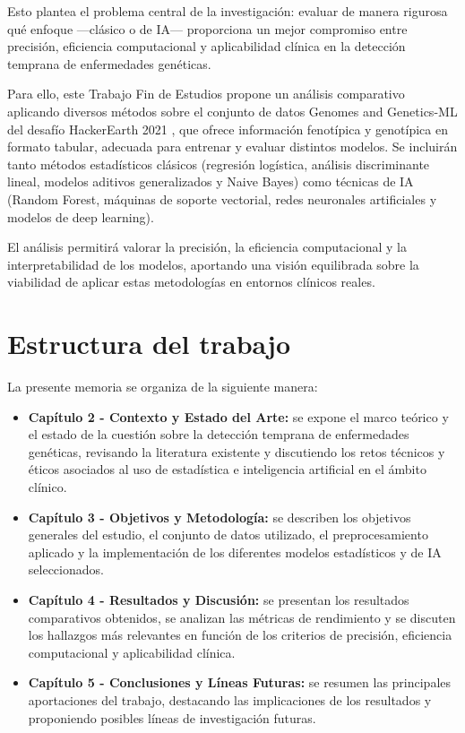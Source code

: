 \documentclass[11pt,a4paper,spanish]{book}
\numberwithin{equation}{chapter}
\numberwithin{figure}{chapter}
\begin{document}
Esto plantea el problema central de la investigación: evaluar de manera rigurosa qué enfoque —clásico o de IA— proporciona un mejor compromiso entre precisión, eficiencia computacional y aplicabilidad clínica en la detección temprana de enfermedades genéticas. 

Para ello, este Trabajo Fin de Estudios propone un análisis comparativo aplicando diversos métodos sobre el conjunto de datos Genomes and Genetics-ML del desafío HackerEarth 2021 \cite{kagglePredictGenetic}, que ofrece información fenotípica y genotípica en formato tabular, adecuada para entrenar y evaluar distintos modelos. Se incluirán tanto métodos estadísticos clásicos (regresión logística, análisis discriminante lineal, modelos aditivos generalizados y Naive Bayes) como técnicas de IA (Random Forest, máquinas de soporte vectorial, redes neuronales artificiales y modelos de deep learning). 

El análisis permitirá valorar la precisión, la eficiencia computacional y la interpretabilidad de los modelos, aportando una visión equilibrada sobre la viabilidad de aplicar estas metodologías en entornos clínicos reales.

\section{Estructura del trabajo}
La presente memoria se organiza de la siguiente manera:

\begin{itemize}
    \item \textbf{Capítulo 2 - Contexto y Estado del Arte:} se expone el marco teórico y el estado de la cuestión sobre la detección temprana de enfermedades genéticas, revisando la literatura existente y discutiendo los retos técnicos y éticos asociados al uso de estadística e inteligencia artificial en el ámbito clínico.
    \item \textbf{Capítulo 3 - Objetivos y Metodología:} se describen los objetivos generales del estudio, el conjunto de datos utilizado, el preprocesamiento aplicado y la implementación de los diferentes modelos estadísticos y de IA seleccionados.
    \item \textbf{Capítulo 4 - Resultados y Discusión:} se presentan los resultados comparativos obtenidos, se analizan las métricas de rendimiento y se discuten los hallazgos más relevantes en función de los criterios de precisión, eficiencia computacional y aplicabilidad clínica.
    \item \textbf{Capítulo 5 - Conclusiones y Líneas Futuras:} se resumen las principales aportaciones del trabajo, destacando las implicaciones de los resultados y proponiendo posibles líneas de investigación futuras.
\end{itemize}
\end{document}
